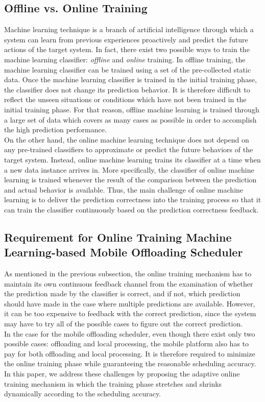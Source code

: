 \documentclass[10pt, conference, compsocconf]{IEEEtran}
\begin{document}
\subsection{Offline vs. Online Training}
%
Machine learning technique is a branch of artificial intelligence
through which a system can learn from previous experiences proactively
and predict the future actions of the target system.
%
In fact, there exist two possible ways to train the machine learning
classifier: \textit{offline} and \textit{online} training.
%
In offline training, the machine learning classifier can be trained
using a set of the pre-collected static data.
%
Once the machine learning classifier is trained in the initial training
phase, the classifier does not change its prediction behavior.
%
It is therefore difficult to reflect the unseen situations or conditions
which have not been trained in the initial training phase.
%
For that reason, offline machine learning is trained through a large set
of data which covers as many cases as possible in order to accomplish
the high prediction performance.\\
%
\indent On the other hand, the online machine learning technique does
not depend on any pre-trained classifiers to approximate or predict 
the future behaviors of the target system.
%
Instead, online machine learning trains its classifier at a time
when a new data instance arrives in.
%
More specifically, the classifier of online machine learning is trained
whenever the result of the comparison between the prediction and actual
behavior is available.
%
Thus, the main challenge of online machine learning is to deliver the
prediction correctness into the training process so that it can train
the classifier continuously based on the prediction correctness feedback.
%
\subsection{Requirement for Online Training Machine Learning-based
Mobile Offloading Scheduler}
%
As mentioned in the previous subsection, the online training mechanism has
to maintain its own continuous feedback channel from the examination of
whether the prediction made by the classifier is correct, and if not,
which prediction should have made in the case where multiple predictions
are available.  
%
However, it can be too expensive to feedback with the correct
prediction, since the system may have to try all of the possible cases
to figure out the correct prediction.\\
%
\indent In the case for the mobile offloading scheduler, even though
there exist only two possible cases: offloading and local processing,
the mobile platform also has to pay for both offloading and local
processing.  
%
It is therefore required to minimize the online training phase while
guaranteeing the reasonable scheduling accuracy.
%
In this paper, we address these challenges by proposing the adaptive
online training mechanism in which the training phase stretches and
shrinks dynamically according to the scheduling accuracy. 
%
\end{document}
